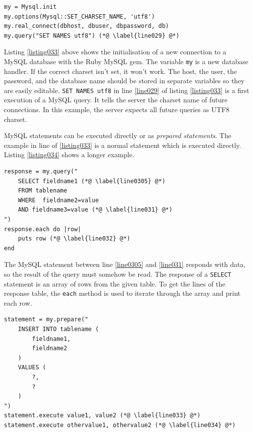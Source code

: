 \begin{lstlisting}[aboveskip=1\baselineskip, caption=Initialising database connection., label=listing033]
my = Mysql.init
my.options(Mysql::SET_CHARSET_NAME, 'utf8')
my.real_connect(dbhost, dbuser, dbpassword, db)
my.query("SET NAMES utf8") (*@ \label{line029} @*)	
\end{lstlisting}

Listing \ref{listing033} above shows the initialisation of a new connection to a MySQL database with the Ruby MySQL gem. The variable \lstinline{my} is a new database handler. If the correct charset isn't set, it won't work. The host, the user, the password, and the database name should be stored in separate variables so they are easily editable. \lstinline{SET NAMES utf8} in line \ref{line029} of listing \ref{listing033} is a first execution of a MySQL query. It tells the server the charset name of future connections. In this example, the server expects all future queries as UTF8  charset.

MySQL statements can be executed directly or as \emph{prepared statements}. The example in line \label{line029} of  \ref{listing033} is a normal statement which is executed directly. Listing \ref{listing034} shows a longer example. 

\begin{lstlisting}[aboveskip=1\baselineskip, caption=Example for a directly executed MySQL query., label=listing034]
response = my.query(" 
	SELECT fieldname1 (*@ \label{line0305} @*)
	FROM tablename 
	WHERE  fieldname2=value
	AND fieldname3=value (*@ \label{line031} @*)
")
response.each do |row|
	puts row (*@ \label{line032} @*)
end
\end{lstlisting}

The MySQL statement between line \ref{line0305} and \ref{line031} responds with data, so the result of the query must somehow be read. The response of a \lstinline{SELECT} statement is an array of rows from the given table. To get the lines of the response table, the \lstinline{each} method is used to iterate through the array and print each row.

\begin{lstlisting}[aboveskip=1\baselineskip, caption=\texttt{joomlaMultiple.rb} usage., label=listing029]
statement = my.prepare("
	INSERT INTO tablename (
		fieldname1,
		fieldname2
	) 
	VALUES (
		?,
		?
	)
")
statement.execute value1, value2 (*@ \label{line033} @*)
statement.execute othervalue1, othervalue2 (*@ \label{line034} @*)
\end{lstlisting}

